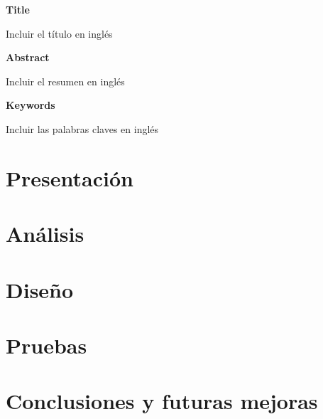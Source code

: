 \documentclass[a4paper,12pt,twoside,final]{book}
\begin{document}

\cleardoublepage

\thispagestyle{empty}
\pagecolor{white}

\Huge{\textbf{Title }}

\normalsize{Incluir el título en inglés}

\Large{\textbf{Abstract }}

\normalsize{Incluir el resumen en inglés}


\textbf{Keywords}

\normalsize{Incluir las palabras claves en inglés}

\clearpage

\thispagestyle{empty}
\pagecolor{white}


\cleardoublepage
\setcounter{page}{1}
\setcounter{tocdepth}{3} %
\setcounter{secnumdepth}{3} %
\tableofcontents
\listoffigures
\listoftables

\afterpage{\null\newpage}
\thispagestyle{empty}
\newpage
\mainmatter
\part{Presentación}






\part{Análisis}



\part{Diseño}




\part{Pruebas}


\part{Conclusiones y futuras mejoras}



%

\cleardoublepage
{}


\printbibheading[heading=bibintoc]
\printbibliography

\renewcommand{\appendixpagename}{Anexos}
\renewcommand{\appendixtocname}{Anexos}
\renewcommand{\appendixname}{Anexo}
\end{document}
